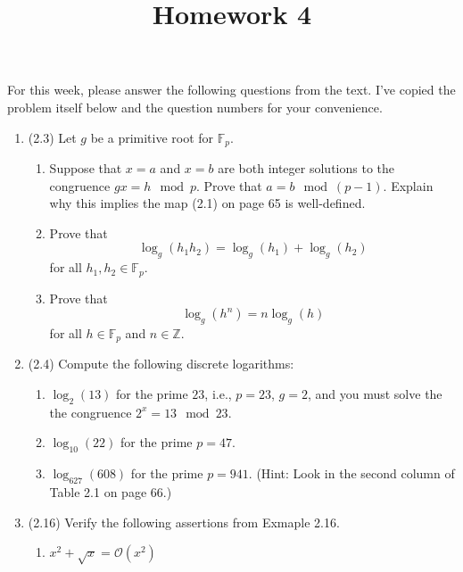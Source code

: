 \documentclass[12pt]{amsart}
\theoremstyle{definition}
\begin{document}
\title{Homework 4}

\maketitle

For this week, please answer the following questions from the text. 
I've copied the problem itself below and the question numbers for 
your convenience. 

\begin{enumerate}
	\item (2.3) Let $g$ be a primitive root for $\mathbb{F}_p$.
	\begin{enumerate}
		\item Suppose that $x=a$ and $x=b$ are both integer solutions to the congruence 
			$gx = h \mod p$. Prove that $a = b \mod (p-1)$. Explain why this implies 
			the map (2.1) on page 65 is well-defined. 
		\item Prove that 
		\begin{displaymath}
			\log_g(h_1 h_2) = \log_g(h_1) + \log_g(h_2) 
		\end{displaymath}
		for all $h_1,h_2 \in \mathbb{F}_p$.
		\item Prove that 
		\begin{displaymath}
			\log_g(h^n) = n\log_g(h) 
		\end{displaymath}
		for all $h \in \mathbb{F}_p$ and $n \in \mathbb{Z}$.
	\end{enumerate}
\item (2.4) Compute the following discrete logarithms:
\begin{enumerate}
\item $\log_2(13)$ for the prime $23$, i.e., $p=23$, $g=2$, and you must solve the the 
	congruence $2^x = 13 \mod 23$. 
\item $\log_{10}(22)$ for the prime $p=47$. 
\item $\log_{627}(608)$ for the prime $p=941$. (Hint: Look in the second column of Table 2.1 on page 66.) 
\end{enumerate}
\item (2.16) Verify the following assertions from Exmaple 2.16. 
	\begin{enumerate}
		\item $x^2 + \sqrt{x} = \mathcal O(x^2)$

\end{enumerate}
\end{enumerate}
\end{document}
